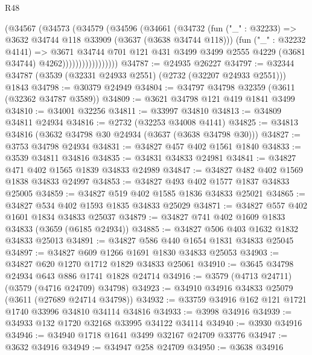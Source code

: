 \begin{lexlean}{R48}
\begin{coremodule}
                        (@34567
                          (@34573
                            (@34579
                              (@34596
                                (@34661
                                  (@34732
                                    (fun ("_" : @32233) =>
                                    @3632 @34744 @118 @33909 (@3637 (@3638 @34744 @118)))
                                    (fun ("_" : @32232 @4141) =>
                                    @3671
                                      @34744
                                      @701
                                      @121
                                      @431
                                      @3499
                                      @3499
                                      @2555
                                      @4229
                                      (@3681 @34744)
                                      @4262)))))))))))))))))
@34787 := @24935 @26227
@34797 := @32344 @34787 (@3539 (@32331 @24933 @2551) (@2732 (@32207 @24933 @2551))) @1843
@34798 := @30379 @24949
@34804 := @34797 @34798 @32359 (@3611 (@32362 @34787 @3589))
@34809 := @3621 @34798 @121 @419 @1841 @3499
@34810 := @34001 @32256
@34811 := @33997 @34810
@34813 := @34809 @34811 @24934
@34816 := @2732 (@32253 @34008 @4141)
@34825 := @34813 @34816 (@3632 @34798 @30 @24934 (@3637 (@3638 @34798 @30)))
@34827 := @3753 @34798 @24934
@34831 := @34827 @457 @402 @1561 @1840
@34833 := @3539 @34811 @34816
@34835 := @34831 @34833 @24981
@34841 := @34827 @471 @402 @1565 @1839 @34833 @24989
@34847 := @34827 @482 @402 @1569 @1838 @34833 @24997
@34853 := @34827 @493 @402 @1577 @1837 @34833 @25005
@34859 := @34827 @519 @402 @1585 @1836 @34833 @25021
@34865 := @34827 @534 @402 @1593 @1835 @34833 @25029
@34871 := @34827 @557 @402 @1601 @1834 @34833 @25037
@34879 := @34827 @741 @402 @1609 @1833 @34833 (@3659 (@6185 @24934))
@34885 := @34827 @506 @403 @1632 @1832 @34833 @25013
@34891 := @34827 @586 @440 @1654 @1831 @34833 @25045
@34897 := @34827 @609 @1266 @1691 @1830 @34833 @25053
@34903 := @34827 @620 @1270 @1712 @1829 @34833 @25061
@34910 := @3645 @34798 @24934 @643 @886 @1741 @1828 @24714
@34916 := @3579 (@4713 @24711) (@3579 (@4716 @24709) @34798)
@34923 := @34910 @34916 @34833 @25079 (@3611 (@27689 @24714 @34798))
@34932 := @33759 @34916 @162 @121 @1721 @1740 @33996 @34810 @34114 @34816
@34933 := @3998 @34916
@34939 := @34933 @132 @1720 @32168 @33995 @34122 @34114
@34940 := @3930 @34916
@34946 := @34940 @1718 @1641 @3499 @32167 @24709 @33776
@34947 := @3632 @34916
@34949 := @34947 @258 @24709
@34950 := @3638 @34916

\end{coremodule}
\end{lexlean}
